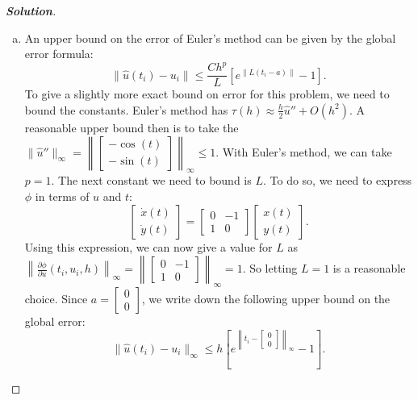 \documentclass[11pt]{article}
\newenvironment{solution}{%
  \begin{proof}[\textbf{Solution}]$ $\par\nobreak\ignorespaces
}{%
  \end{proof}
}
\theoremstyle{definition}
\begin{document}
\begin{solution}
\begin{enumerate}[(a)]
\item An upper bound on the error of Euler's method can be given by the global error formula: $$\|\hat{u}(t_i) - u_i\| \leq \frac{Ch^p}{L}\left[e^{\|L(t_i - a)\|} - 1\right].$$ To give a slightly more exact bound on error for this problem, we need to bound the constants. Euler's method has $\tau(h) \approx \frac{h}{2} \hat{u}'' + O(h^2)$. A reasonable upper bound then is to take the $\|\hat{u}''\|_\infty = \left\|\begin{bmatrix*}-\cos(t) \\ -\sin(t)\end{bmatrix*}\right\|_\infty\leq 1$. With Euler's method, we can take $p = 1$. The next constant we need to bound is $L$. To do so, we need to express $\phi$ in terms of $u$ and $t$:
$$\begin{bmatrix*}\dot{x}(t) \\ \dot{y}(t)\end{bmatrix*} = \begin{bmatrix*}0 & -1 \\ 1 & 0\end{bmatrix*}\begin{bmatrix*}x(t) \\ y(t)\end{bmatrix*}.$$
Using this expression, we can now give a value for $L$ as $\left\|\frac{\partial \phi}{\partial u}(t_i, u_i, h)\right\|_\infty = \left\|\begin{bmatrix*}0 & -1 \\ 1 & 0\end{bmatrix*}\right\|_\infty = 1$. So letting $L = 1$ is a reasonable choice.
Since $a = \begin{bmatrix*}0 \\ 0\end{bmatrix*}$, we write down the following upper bound on the global error:
$$\|\hat{u}(t_i) - u_i\|_\infty \leq h\left[e^{\left\|t_i - \begin{bmatrix*}0 \\ 0\end{bmatrix*}\right\|_{\infty}} - 1\right].$$


\end{enumerate}
\end{solution}
\end{document}
